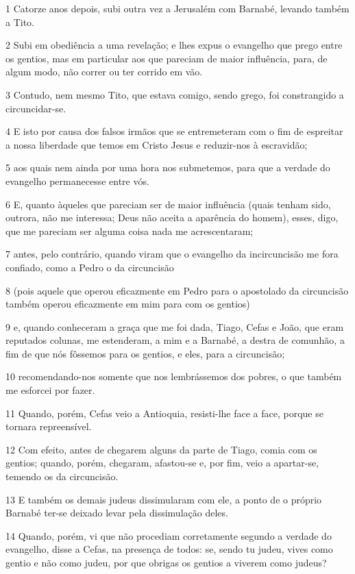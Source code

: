 \par 1 Catorze anos depois, subi outra vez a Jerusalém com Barnabé, levando também a Tito.
\par 2 Subi em obediência a uma revelação; e lhes expus o evangelho que prego entre os gentios, mas em particular aos que pareciam de maior influência, para, de algum modo, não correr ou ter corrido em vão.
\par 3 Contudo, nem mesmo Tito, que estava comigo, sendo grego, foi constrangido a circuncidar-se.
\par 4 E isto por causa dos falsos irmãos que se entremeteram com o fim de espreitar a nossa liberdade que temos em Cristo Jesus e reduzir-nos à escravidão;
\par 5 aos quais nem ainda por uma hora nos submetemos, para que a verdade do evangelho permanecesse entre vós.
\par 6 E, quanto àqueles que pareciam ser de maior influência (quais tenham sido, outrora, não me interessa; Deus não aceita a aparência do homem), esses, digo, que me pareciam ser alguma coisa nada me acrescentaram;
\par 7 antes, pelo contrário, quando viram que o evangelho da incircuncisão me fora confiado, como a Pedro o da circuncisão
\par 8 (pois aquele que operou eficazmente em Pedro para o apostolado da circuncisão também operou eficazmente em mim para com os gentios)
\par 9 e, quando conheceram a graça que me foi dada, Tiago, Cefas e João, que eram reputados colunas, me estenderam, a mim e a Barnabé, a destra de comunhão, a fim de que nós fôssemos para os gentios, e eles, para a circuncisão;
\par 10 recomendando-nos somente que nos lembrássemos dos pobres, o que também me esforcei por fazer.
\par 11 Quando, porém, Cefas veio a Antioquia, resisti-lhe face a face, porque se tornara repreensível.
\par 12 Com efeito, antes de chegarem alguns da parte de Tiago, comia com os gentios; quando, porém, chegaram, afastou-se e, por fim, veio a apartar-se, temendo os da circuncisão.
\par 13 E também os demais judeus dissimularam com ele, a ponto de o próprio Barnabé ter-se deixado levar pela dissimulação deles.
\par 14 Quando, porém, vi que não procediam corretamente segundo a verdade do evangelho, disse a Cefas, na presença de todos: se, sendo tu judeu, vives como gentio e não como judeu, por que obrigas os gentios a viverem como judeus?
